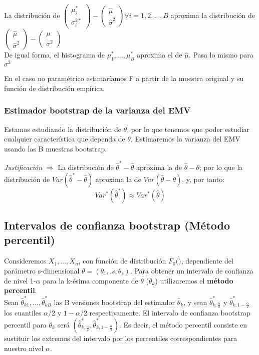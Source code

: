 \noindent La distribución de $\begin{pmatrix}\mu^*_i \\ \sigma^{2*}_i\end{pmatrix}-\begin{pmatrix}\hat\mu \\ \hat\sigma^{2}\end{pmatrix}\forall i=1,2,\dots,B$ aproxima la distribución de $\begin{pmatrix}\hat\mu \\ \hat\sigma^{2}\end{pmatrix}-\begin{pmatrix}\mu \\ \sigma^{2}\end{pmatrix}$\\
De igual forma, el histograma de $\mu^*_1,\dots,\mu^*_B$ aproxima el de $\hat\mu$. Pasa lo mismo para $\sigma^2$

En el caso no paramétrico estimaríamos F a partir de la muestra original y su función de distribución empírica.

\subsubsection{Estimador bootstrap de la varianza del EMV}

Estamos estudiando la distribución de $\theta$, por lo que tenemos que poder estudiar cualquier característica que dependa de $\theta$. Estimaremos la varianza del EMV usando las B muestras bootstrap.

\textit{Justificación} $\Longrightarrow$ La distribución de $\hat\theta^*-\hat\theta$ aproxima la de $\hat\theta-\theta$; por lo que la distribución de $Var(\hat\theta^*-\hat\theta)$ aproxima la de $Var(\hat\theta-\theta)$, y, por tanto:
$$Var^*(\hat\theta^*)\approx Var^*(\hat\theta)$$

\subsection{Intervalos de confianza bootstrap (Método percentil)}
Consideremos $X_1,\dots,X_n$, con función de distribución $F_0(\dot)$, dependiente del parámetro s-dimensional $\theta=(\theta_1,.s,\theta_s)$. Para obtener un intervalo de confianza de nivel 1-$\alpha$ para la k-ésima componente de $\theta$ ($\theta_k$) utilizaremos el \textbf{método percentil}.\\

Sean $\hat\theta_{k1}^*,\dots,\hat\theta_{kB}^*$ las B versiones bootstrap del estimador $\hat\theta_k$, y sean $\hat\theta^*_{k,\frac{\alpha}{2}}$ y $\hat\theta^*_{k,1-\frac{\alpha}{2}}$ los cuantiles $\alpha/2$ y $1-\alpha/2$ respectivamente.
El intervalo de confianza bootstrap percentil para $\theta_k$ será $\left(\hat\theta^*_{k,\frac{\alpha}{2}},\hat\theta^*_{k,1-\frac{\alpha}{2}} \right)$. Es decir, el método percentil consiste en sustituir los extremos del intervalo por los percentiles correspondientes para nuestro nivel $\alpha$.

